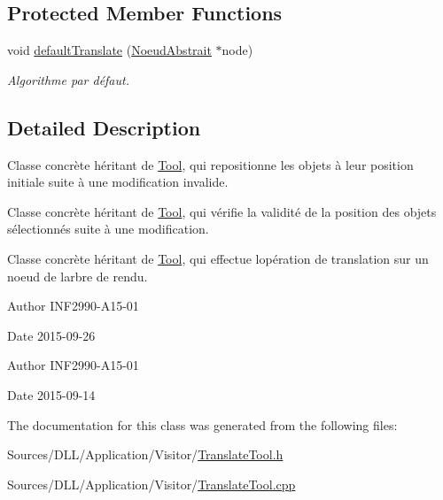 \subsection*{Protected Member Functions}
\begin{DoxyCompactItemize}
\item 
void \hyperlink{group__inf2990_ga1e47597de16ebba1986441232607d6dc}{default\+Translate} (\hyperlink{class_noeud_abstrait}{Noeud\+Abstrait} $\ast$node)
\begin{DoxyCompactList}\small\item\em Algorithme par défaut. \end{DoxyCompactList}\end{DoxyCompactItemize}


\subsection{Detailed Description}
Classe concrète héritant de \hyperlink{class_tool}{Tool}, qui repositionne les objets à leur position initiale suite à une modification invalide. 

Classe concrète héritant de \hyperlink{class_tool}{Tool}, qui vérifie la validité de la position des objets sélectionnés suite à une modification.

Classe concrète héritant de \hyperlink{class_tool}{Tool}, qui effectue l\textquotesingle{}opération de translation sur un noeud de l\textquotesingle{}arbre de rendu.

\begin{DoxyAuthor}{Author}
I\+N\+F2990-\/\+A15-\/01 
\end{DoxyAuthor}
\begin{DoxyDate}{Date}
2015-\/09-\/26
\end{DoxyDate}
\begin{DoxyAuthor}{Author}
I\+N\+F2990-\/\+A15-\/01 
\end{DoxyAuthor}
\begin{DoxyDate}{Date}
2015-\/09-\/14 
\end{DoxyDate}


The documentation for this class was generated from the following files\+:\begin{DoxyCompactItemize}
\item 
Sources/\+D\+L\+L/\+Application/\+Visitor/\hyperlink{_translate_tool_8h}{Translate\+Tool.\+h}\item 
Sources/\+D\+L\+L/\+Application/\+Visitor/\hyperlink{_translate_tool_8cpp}{Translate\+Tool.\+cpp}\end{DoxyCompactItemize}
